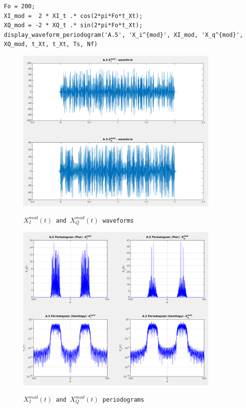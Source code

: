 \documentclass[11pt]{article}
\begin{document}
    \begin{lstlisting}[caption = {A.5 \texttt{Calculate $X_I^{mod}(t)$ and $X_Q^{mod}(t)$}}]
% A.5
Fo = 200;
XI_mod =  2 * XI_t .* cos(2*pi*Fo*t_Xt);
XQ_mod = -2 * XQ_t .* sin(2*pi*Fo*t_Xt);
display_waveform_periodogram('A.5', 'X_i^{mod}', XI_mod, 'X_q^{mod}', XQ_mod, t_Xt, t_Xt, Ts, Nf)
    \end{lstlisting}
    
    \begin{figure}[H]
        \centering
        \includegraphics[scale=0.5, width=0.9\textwidth]{img/A5_mod_wave.png} \\
        \caption{\texttt{$X_I^{mod}(t)$ and $X_Q^{mod}(t)$ waveforms}}
    \end{figure}
    
    \begin{figure}[H]
        \centering
        \includegraphics[scale=0.5, width=0.9\textwidth]{img/A5_mod_period.png} \\
        \caption{\texttt{$X_I^{mod}(t)$ and $X_Q^{mod}(t)$ periodograms}}
    \end{figure}
    
\end{document}
